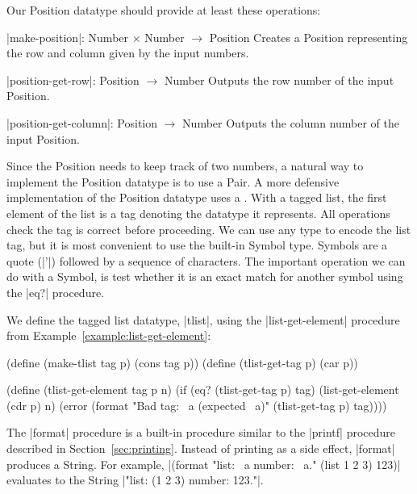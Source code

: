\begin{schemeregion}
{Our Position datatype should provide at least these operations:
\begin{procedurelist}
\item[\scheme|make-position|: Number $\times$ Number $\rightarrow$ Position] \forcenl Creates a Position representing the row and column given by the input numbers.
\item[\scheme|position-get-row|: Position $\rightarrow$ Number] \forcenl Outputs the row number of the input Position.
\item[\scheme|position-get-column|: Position $\rightarrow$ Number] \forcenl Outputs the column number of the input Position.
\end{procedurelist}

Since the Position needs to keep track of two numbers, a natural way to implement the Position datatype is to use a Pair.  A more defensive implementation of the Position datatype uses a .  With a tagged list, the first element of the list is a tag denoting the datatype it represents.  All operations check the tag is correct before proceeding.  We can use any type to encode the list tag, but it is most convenient to use the built-in Symbol type.  Symbols are a quote (\scheme|'|) followed by a sequence of characters.  The important operation we can do with a Symbol, is test whether it is an exact match for another symbol using the \scheme|eq?| procedure.\label{ref:symbol} 

We define the tagged list datatype, \scheme|tlist|, using the \scheme|list-get-element| procedure from Example~\ref{example:list-get-element}:

\begin{schemedisplay}
(define (make-tlist tag p) (cons tag p))
(define (tlist-get-tag p) (car p))

(define (tlist-get-element tag p n)
  (if (eq? (tlist-get-tag p) tag)
      (list-get-element (cdr p) n)      
      (error (format "Bad tag: ~a (expected ~a)" 
                     (tlist-get-tag p) tag))))
\end{schemedisplay}

The \scheme|format| procedure is a built-in procedure similar to the \scheme|printf| procedure described in Section~\ref{sec:printing}.  Instead of printing as a side effect, \scheme|format| produces a String.  For example, \scheme|(format "list: ~a number: ~a." (list 1 2 3) 123)| evaluates to the String \schemeresult|"list: (1 2 3) number: 123."|. 

}
\end{schemeregion}
